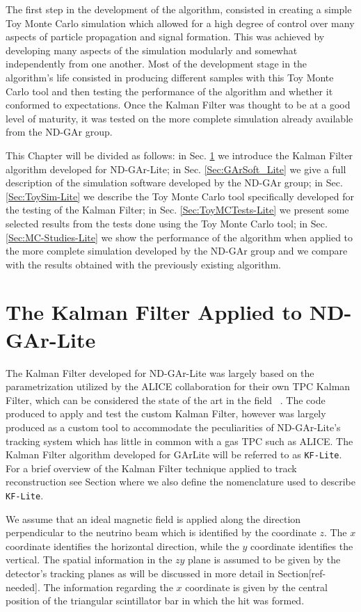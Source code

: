 The first step in the development of the algorithm, consisted in creating a simple Toy Monte Carlo simulation which allowed for a high degree of control over many aspects of particle propagation and signal formation. This was achieved by developing many aspects of the simulation modularly and somewhat independently from one another. Most of the development stage in the algorithm's life consisted in producing different samples with this Toy Monte Carlo tool and then testing the performance of the algorithm and whether it conformed to expectations. Once the Kalman Filter was thought to be at a good level of maturity, it was tested on the more complete simulation already available from the ND-GAr group.

This Chapter will be divided as follows: in Sec. \ref{Sec:KFLite} we introduce the Kalman Filter algorithm developed for ND-GAr-Lite; in Sec. \ref{Sec:GArSoft_Lite} we give a full description of the simulation software developed by the ND-GAr group; in Sec. \ref{Sec:ToySim-Lite} we describe the Toy Monte Carlo tool specifically developed for the testing of the Kalman Filter; in Sec. \ref{Sec:ToyMCTests-Lite} we present some selected results from the tests done using the Toy Monte Carlo tool; in Sec. \ref{Sec:MC-Studies-Lite} we show the performance of the algorithm when applied to the more complete simulation developed by the ND-GAr group and we compare with the results obtained with the previously existing algorithm.

\section{The Kalman Filter Applied to ND-GAr-Lite}
\label{Sec:KFLite}
The Kalman Filter developed for ND-GAr-Lite was largely based on the parametrization utilized by the ALICE collaboration for their own TPC Kalman Filter, which can be considered the state of the art in the field ~\cite{Ivanov:2003yr, Arslandok:2022dyb}. The code produced to apply and test the custom Kalman Filter, however was largely produced as a custom tool to accommodate the peculiarities of ND-GAr-Lite's tracking system which has little in common with a gas TPC such as ALICE. The Kalman Filter algorithm developed for GArLite will be referred to as \texttt{KF-Lite}. For a brief overview of the Kalman Filter technique applied to track reconstruction see Section where we also define the nomenclature used to describe \texttt{KF-Lite}.

We assume that an ideal magnetic field is applied along the direction perpendicular to the neutrino beam which is identified by the coordinate $z$. The $x$ coordinate identifies the horizontal direction, while the $y$ coordinate identifies the vertical.  The spatial information in the $zy$ plane is assumed to be given by the detector's tracking planes as will be discussed in more detail in Section[ref-needed]. The information regarding the $x$ coordinate is given by the central position of the triangular scintillator bar in which the hit was formed.

